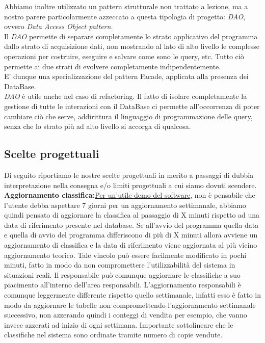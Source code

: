 \documentclass[a4paper,12pt,titlepage]{article}
\begin{document}
Abbiamo inoltre utilizzato un pattern strutturale non trattato a lezione, ma a nostro parere particolarmente azzeccato a questa tipologia di progetto: \textit{DAO}, ovvero \textit{Data Access Object pattern.}\\
Il \textit{DAO} permette di separare completamente lo strato applicativo del programma dallo strato di acquisizione dati, non mostrando al lato di alto livello le complesse operazioni per costruire, eseguire e salvare come sono le query, etc. Tutto ciò permette ai due strati di evolvere completamente indipendentemente.\\
E' dunque una specializzazione del pattern Facade, applicata alla presenza dei DataBase.\\
\textit{DAO} è utile anche nel caso di refactoring. Il fatto di isolare completamente la gestione di tutte le interazioni con il DataBase ci permette all'occorrenza di poter cambiare ciò che serve, addirittura il linguaggio di programmazione delle query, senza che lo strato più ad alto livello si accorga di qualcosa.\\


\subsection{Scelte progettuali}\label{sec:scelte progettuali}

Di seguito riportiamo le nostre scelte progettuali in merito a passaggi di dubbia interpretazione nella consegna 
e/o limiti progettuali a cui siamo dovuti scendere.\\


\textbf{Aggiornamento classifica:}\underline{Per un'utile demo del software}, non è pensabile che l'utente debba aspettare 7 giorni per un aggiornamento settimanale, abbiamo quindi pensato di aggiornare la classifica al passaggio di X minuti rispetto ad una data di riferimento presente nel database.
Se all'avvio del programma quella data e quella di avvio del programma differiscono di più di X minuti allora avviene un aggiornamento di classifica e la data di riferimento viene aggiornata al più vicino aggiornamento teorico. Tale vincolo può essere facilmente modificato in pochi minuti, fatto in modo da non compromettere l'utilizzabilità del sistema in situazioni reali.
Il responsabile può comunque aggiornare le classifiche a suo piacimento all'interno dell'area responsabili.
L'aggiornamento responsabili è comunque leggermente differente rispetto quello settimanale,
infatti esso è fatto in modo da aggiornare le tabelle non compromettendo l'aggiornamento settimanale successivo,
non azzerando quindi i conteggi di vendita per esempio, che vanno invece azzerati ad inizio di ogni settimana.
Importante sottolineare che le classifiche nel sistema sono ordinate tramite numero di copie vendute.\\
\end{document}
